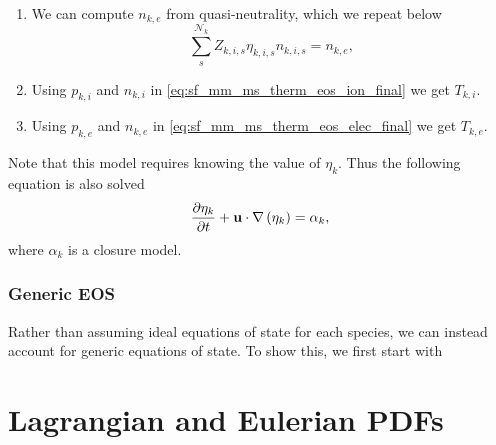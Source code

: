 \documentclass[a4paper,11pt]{report}
\begin{document}
\begin{enumerate}
    \item We can compute $n_{k,e}$ from quasi-neutrality, which we repeat below
    \begin{equation}
        \sum_s^{\mathcal{N}_k} Z_{k,i,s} \eta_{k,i,s} n_{k,i,s} = n_{k,e},
    \end{equation}

    \item Using $p_{k,i}$ and $n_{k,i}$ in \cref{eq:sf_mm_ms_therm_eos_ion_final} we get $T_{k,i}$.

    \item Using $p_{k,e}$ and $n_{k,e}$ in \cref{eq:sf_mm_ms_therm_eos_elec_final} we get $T_{k,e}$.
\end{enumerate}

Note that this model requires knowing the value of $\eta_k$. Thus the following equation is also solved
\begin{equation}
    \frac{\partial \eta_k}{\partial t} + \mathbf{u} \cdot \nabla \left( \eta_k \right) = \alpha_k,
\end{equation}
where $\alpha_k$ is a closure model.

\subsection{Generic EOS}
Rather than assuming ideal equations of state for each species, we can instead account for generic equations of state. To show this, we first start with

\appendix

\chapter{Lagrangian and Eulerian PDFs}

\end{document}
